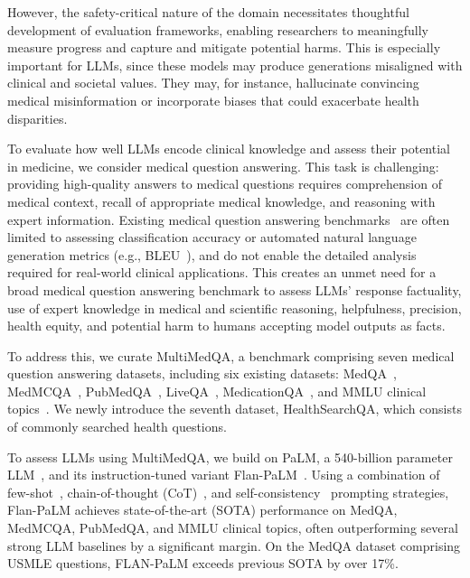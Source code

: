 \documentclass[10pt, letter, onecolumn]{arxiv}
\begin{document}
\begin{refsection}
However, the safety-critical nature of the domain necessitates thoughtful development of evaluation frameworks, enabling researchers to meaningfully measure progress and capture and mitigate potential harms. This is especially important for LLMs, since these models may produce generations misaligned with clinical and societal values. They may, for instance, hallucinate convincing medical misinformation or incorporate biases that could exacerbate health disparities.

To evaluate how well LLMs encode clinical knowledge and assess their potential in medicine, we consider medical question answering. This task is challenging: providing high-quality answers to medical questions requires comprehension of medical context, recall of appropriate medical knowledge, and reasoning with expert information. Existing medical question answering benchmarks~\cite{jin2021disease} are often limited to assessing classification accuracy or automated natural language generation metrics (e.g., BLEU~\cite{papineni2002bleu}), and do not enable the detailed analysis required for real-world clinical applications. This creates an unmet need for a broad medical question answering benchmark to assess LLMs’ response factuality, use of expert knowledge in medical and scientific reasoning, helpfulness, precision, health equity, and potential harm to humans accepting model outputs as facts.  

To address this, we curate MultiMedQA, a benchmark comprising seven medical question answering datasets, including six existing datasets: MedQA~\cite{jin2021disease}, MedMCQA~\cite{pal2022medmcqa}, PubMedQA~\cite{jin2019pubmedqa}, LiveQA~\cite{abacha2017overview}, MedicationQA~\cite{abacha2019bridging}, and MMLU clinical topics~\cite{hendrycks2020measuring}. We newly introduce the seventh dataset, HealthSearchQA, which consists of commonly searched health questions.

To assess LLMs using MultiMedQA, we build on PaLM, a 540-billion parameter LLM~\cite{chowdhery2022palm}, and its instruction-tuned variant Flan-PaLM~\cite{chung2022scaling}. Using a combination of few-shot~\cite{brown2020language}, chain-of-thought (CoT)~\cite{wei2022chain}, and self-consistency~\cite{wang2022self} prompting strategies, Flan-PaLM achieves state-of-the-art (SOTA) performance on MedQA, MedMCQA, PubMedQA, and MMLU clinical topics, often outperforming several strong LLM baselines by a significant margin. On the MedQA dataset comprising USMLE questions, FLAN-PaLM exceeds previous SOTA by over 17\%.


\end{refsection}
\end{document}
